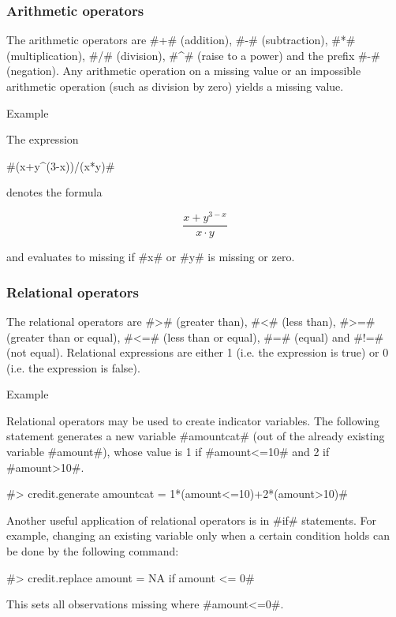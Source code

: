 \subsubsection{Arithmetic operators}

The arithmetic operators are #+# (addition), #-# (subtraction),
#*# (multiplication), #/# (division), #^# (raise to a power) and
the prefix #-# (negation). Any arithmetic operation on a missing
value or an impossible arithmetic operation (such as division by
zero) yields a missing value.\\

\begin{stanza}{Example}

The expression

#(x+y^(3-x))/(x*y)#

denotes the formula

$$
\frac{x+y^{3-x}}{x\cdot y}
$$

and evaluates to missing if #x# or #y# is missing or zero.
\end{stanza}

\subsubsection{Relational operators}

The relational operators are #># (greater than), #<# (less than),
#>=# (greater than or equal), #<=# (less than or equal), #=#
(equal) and #!=# (not equal). Relational expressions are either 1
(i.e. the expression is true) or 0 (i.e. the expression is
false).\\

\begin{stanza}{Example}

Relational operators may be used to create indicator variables.
The following statement generates a new variable #amountcat# (out
of the already existing variable #amount#), whose
value is 1 if #amount<=10# and 2 if #amount>10#.

#> credit.generate amountcat = 1*(amount<=10)+2*(amount>10)#

Another useful application of relational operators is in #if#
statements. For example, changing
an existing variable only when a certain condition holds can be done by the following command:

#> credit.replace amount = NA if amount <= 0#

This sets all observations missing where #amount<=0#.
\end{stanza}

